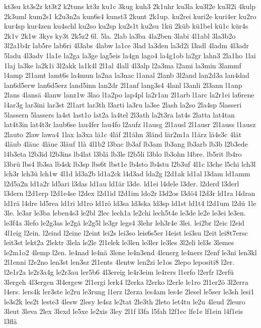 {kt3su
kt3s2z
kt3t2
k2tuns
kt3z
ku1c
3kug
kuh3
2k1uhr
ku3la
ku3l2e
ku3l2i
4kulp
2k3uml
kum2s1
k2u3n2a
kun6s4
kunst3
2kunt
2k1up.
ku2rei
kuri2e
kuri4er
ku2ro
kur4sp
kur4zen
ku4schl
ku2so
ku2sp
ku2s1t
ku2su
1kü
2küb
kü1bel
kü1c
kür4s
2k1v
2k1w
3kys
ky3t
2k5z2
6l.
5la.
2lab
la3ba
4la2ben
3labi
4l1abl
3la3b2o
3l2a1b4r
lab5re
lab6ri
4l3abs
4labw
la1ce
3lad
la3den
la3d2i
l3adl
4ladm
4l3adr
5ladu
4l3adv
1la1e
la2ga
la3ge
lag5eis
la4gn
lago4
la4g1ob
la2gr
lahn3
2la1ho
1lai
1laj
la3ke
la2k1i
3l2akk
la1k4l
2l1al
4lall
4l3alp
l2a3ma
l2ami
la3min
3lammf
l4amp
2l1amt
lamt6s
la4mun
la2na
la3nac
l1anal
2lanb
3l2and
lan2d3a
lan4dad
lan6d5erw
lan6d5erz
land5inn
lan2dr
2l1anf
lang3s4
4lanl
l3anli
2l3ann
l1anp
2lans
4lansä
4lanw
lanz1w
3lao
l1a2po
lap4pl
la2r1an
2l1arb
l1arc
la2r1ei
la6rene
l4ar3g
lar3ini
lar3st
2l1art
lar3th
l3arti
la3ru
la3se
2lash
la2so
2la4sp
5lasseri
5lassern
5lassers
la4st
last1o
lat2a
la4tel
2l3ath
la2t3ra
lat4s
2latta
lat4tan
lat4t3in
lat4t3r
laub6se
lau4fer
lau4fo
l2aufz
l1ausg
2l1ausl
2l1ausr
2l1auss
l1ausz
2lauto
2law
lawa4
1lax
la3xa
lä1c
4läf
2l1ähn
3länd
lär2m1a
l1ärz
lä4s3c
4lät
4läub
4läuc
4läue
3läuf
1là
4l1b2
l3bac
lb3af
lb3am
lb3ang
lb3arb
lb3b
l2b3ede
l4b3eta
l2b3id
l2b3ins
lb4lat
l3blä
lb3le
l2b5li
l3blo
lb3ohn
l4bre.
lb5rit
lb4ro
l3brü
lbs4
lb3sa
lb4sk
lb3sp
lbs6t
lbst1e
lb4sto
lb4stu
l2b3uf
4l1c
l3che
l5chi
lch3l
lch3r
lch3ü
lch1w
4l1d
ld3a2b
ld1a2ck
l4d3ad
lda2g
l2d1ak
ld1al
l3dam
ld1amm
l2d5a2n
ld1a2r
ld5ari
l3das
ld1au
ld1är
l3de.
ld1ei
l4dele
l3der.
l2derd
l3derl
l3dern
l2d1erp
l2d1e4se
l2dex
l2d1id
l2d1im
ldo2r
l3d2os
l3dö4
l2d3r
ld1ra
l4dran
ld1rä
l4dre
ld5rea
ld1ri
ld1ro
ld1rö
ld3sa
ld3ska
ld3sp
ld1st
ld1t4
l2d1um
l2dü
1le
3le.
le3ar
le3ba
leben4s3
le2bl
2lec
lech1a
le2chi
lech5t4e
le3de
le2e
le3ei
le3en.
le3f4a
3lefo
le2g3as
le2gä
le2g5l
le3gr
legs4
3lehr
leh3r4e
3lei.
lei2br
l2eic
l2eid
4l1eig
l2ein.
l2eind
l2eine
l2eint
lei2s
lei3so
leis6s5er
l4eist
lei3su
l2eit
lei8t7ersc
leit3st
lekt2a
2lektr
3lela
le2le
2l1elek
le3len
le3ler
le3les
3l2eli
lel3s
3lemes
le2m1o2
4lemp
l2en.
le4nad
le4nä
3lene
le4n3end
4lenerg
le4ners
l2enf
le3ni
len3kl
2l1enni
l2e2no
len3st
len3sz
2l1ents
4lentw
len2zi
le1os
2lepo
lepositi8
l2er.
l2e1r2a
le2r3a4g
le2r3au
ler5b6
4l3ereig
le4r3eim
le4rers
l1erfo
l2erfr
l2erfü
3lergeh
4l3ergen
3l4ergew
2l1ergi
lerk4
l2erka
l2erko
l2erle
le1ro
2l1er2ö
3l2erra
l4ers.
lers4k
ler3ste
le2ru
le3rung
l1erz
l2erza
les4am
les4e
2lesel
le5ser
le3sh
lesi1
le3s2k
les2t
leste3
4lesw
2lesy
le4sz
le2tat
2le3th
2leto
let4tu
le2u
4leud
2leuro
3leut
3leva
2lex
3lexd
le5xe
le2xis
3ley
2l1f
l3fa
l5fah
l2f1ec
lfe1e
lf1ein
l4f1eis
l3flä
}
